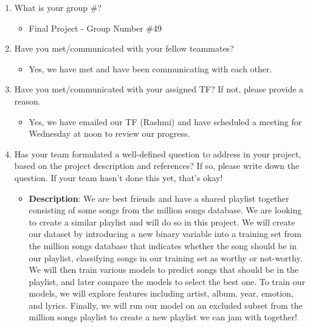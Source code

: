 \documentclass[12pt]{article}
\begin{document}
 

\medskip


\bigskip

\begin{enumerate}
    \item What is your group \#?
    \begin{itemize}
        \item Final Project - Group Number \#49
    \end{itemize}
    \item Have you met/communicated with your fellow teammates?
    \begin{itemize}
        \item Yes, we have met and have been communicating with each other.
    \end{itemize}
    \item Have you met/communicated with your assigned TF? If not, please provide a reason.
    \begin{itemize}
        \item Yes, we have emailed our TF (Rashmi) and have scheduled a meeting for Wednesday at noon to review our progress.
    \end{itemize}
    \item Has your team formulated a well-defined question to address in your project, based on the project description and references? If so, please write down the question. If your team hasn’t done this yet, that’s okay!
    \begin{itemize}
        \item \textbf{Description}: We are best friends and have a shared playlist together consisting of some songs from the million songs database. We are looking to create a similar playlist and will do so in this project. We will create our dataset by introducing a new binary variable into a training set from the million songs database that indicates whether the song should be in our playlist, classifying songs in our training set as worthy or not-worthy. We will then train various models to predict songs that should be in the playlist, and later compare the models to select the best one. To train our models, we will explore features including artist, album, year, emotion, and lyrics. Finally, we will run our model on an excluded subset from the million songs playlist to create a new playlist we can jam with together!

\end{itemize}
\end{enumerate}
\end{document}
